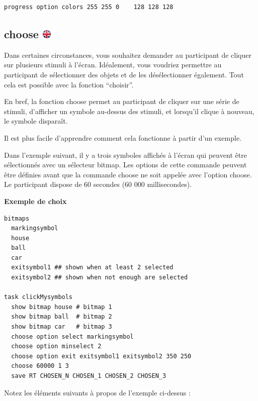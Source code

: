 \documentclass[
]{book}
\begin{document}
\begin{verbatim}
progress option colors 255 255 0    128 128 128
\end{verbatim}

\hypertarget{choose}{%
\subsection[choose ]{\texorpdfstring{choose
\href{https://www.psytoolkit.org/doc3.2.0/syntax.html\#task-choose}{\protect\includegraphics{img/ukflag.png}}}{choose }}\label{choose}}

Dans certaines circonstances, vous souhaitez demander au participant de
cliquer sur plusieurs stimuli à l'écran. Idéalement, vous voudriez
permettre au participant de sélectionner des objets et de les
désélectionner également. Tout cela est possible avec la fonction
``choisir''.

En bref, la fonction choose permet au participant de cliquer sur une
série de stimuli, d'afficher un symbole au-dessus des stimuli, et
lorsqu'il clique à nouveau, le symbole disparaît.

Il est plus facile d'apprendre comment cela fonctionne à partir d'un
exemple.

Dans l'exemple suivant, il y a trois symboles affichés à l'écran qui
peuvent être sélectionnés avec un sélecteur bitmap. Les options de cette
commande peuvent être définies avant que la commande choose ne soit
appelée avec l'option choose. Le participant dispose de 60 secondes (60
000 millisecondes).

\textbf{Exemple de choix}

\begin{verbatim}
bitmaps
  markingsymbol
  house
  ball
  car
  exitsymbol1 ## shown when at least 2 selected
  exitsymbol2 ## shown when not enough are selected

task clickMysymbols
  show bitmap house # bitmap 1
  show bitmap ball  # bitmap 2
  show bitmap car   # bitmap 3
  choose option select markingsymbol
  choose option minselect 2
  choose option exit exitsymbol1 exitsymbol2 350 250
  choose 60000 1 3
  save RT CHOSEN_N CHOSEN_1 CHOSEN_2 CHOSEN_3
\end{verbatim}

Notez les éléments suivants à propos de l'exemple ci-dessus :
\end{document}
